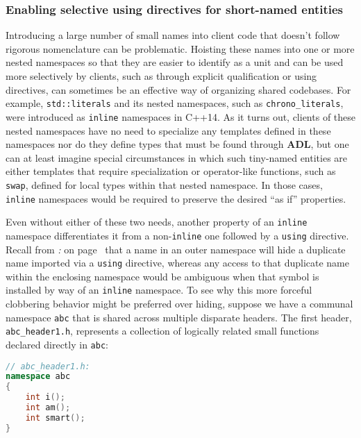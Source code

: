 \subsubsection[Enabling selective {\tt using} directives for short-named entities]{Enabling selective {\SubsubsecCode using} directives for short-named entities}\label{enabling-selective-using-directives-for-short-named-entities}

Introducing a large number of small names into client code that doesn't
follow rigorous nomenclature can be problematic. Hoisting these names
into one or more nested namespaces so that they are easier to identify
as a unit and can be used more selectively by clients, such as through
explicit qualification or using directives, can sometimes be an
effective way of organizing shared codebases. For example,
\texttt{std::literals} and its nested namespaces, such as
\texttt{chrono\_literals}, were introduced as \texttt{inline} namespaces
in C++14. As it turns out, clients of these nested namespaces have no
need to specialize any templates defined in these namespaces nor do they
define types that must be found through \textbf{ADL}, but one can at
least imagine special circumstances in which such tiny-named entities
are either templates that require specialization or operator-like
functions, such as \texttt{swap}, defined for local types within that
nested namespace. In those cases, \texttt{inline} namespaces would be
required to preserve the desired ``as if'' properties.

Even without either of these two needs, another property of an
\texttt{inline} namespace differentiates it from a non-\texttt{inline}
one followed by a \texttt{using} directive. Recall from
\textit{: } on page~\pageref{loss-of-access-to-duplicate-names-in-enclosing-namespace} that a name in an outer namespace will
hide a duplicate name imported via a \texttt{using} directive, whereas
any access to that duplicate name within the enclosing namespace would
be ambiguous when that symbol is installed by way of an \texttt{inline}
namespace. To see why this more forceful clobbering behavior might be
preferred over hiding, suppose we have a communal namespace \texttt{abc}
that is shared across multiple disparate headers. The first header,
\texttt{abc\_header1.h}, represents a collection of logically related
small functions declared directly in \texttt{abc}:

\begin{lstlisting}[language=C++]
// abc_header1.h:
namespace abc
{
    int i();
    int am();
    int smart();
}
\end{lstlisting}

